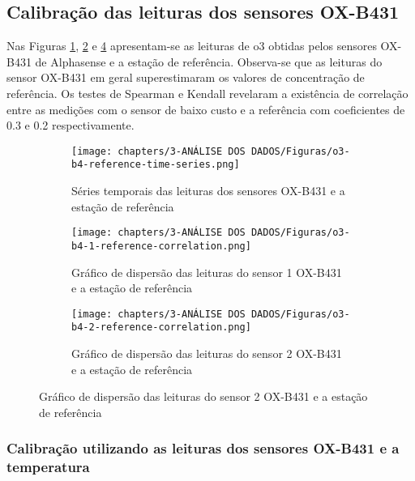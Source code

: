 
\subsection{Calibração das leituras dos sensores OX-B431}

Nas Figuras \ref{fig:data-o3-reference-time-series}, \ref{fig:data-o3-1-reference-corr} e \ref{fig:data-o3-2-reference-corr} apresentam-se as leituras de \acrshort{o3} obtidas pelos sensores OX-B431 de Alphasense e a estação de referência. Observa-se que as leituras do sensor OX-B431 em geral superestimaram os valores de concentração de referência. Os testes de Spearman e Kendall revelaram a existência de correlação entre as medições com o sensor de baixo custo e a referência com coeficientes de 0.3 e 0.2 respectivamente.

\begin{figure}[h]
    \centering
    \caption{Séries temporais e gráficos de dispersão das medições de \acrshort{o3}}
    \begin{subfigure}{0.99\textwidth}
        \texttt{[image: chapters/3-ANÁLISE DOS DADOS/Figuras/o3-b4-reference-time-series.png]}
        \caption{Séries temporais das leituras dos sensores OX-B431 e a estação de referência}
        \label{fig:data-o3-reference-time-series}
    \end{subfigure}
    \hfill
    \begin{subfigure}{0.495\textwidth}
        \texttt{[image: chapters/3-ANÁLISE DOS DADOS/Figuras/o3-b4-1-reference-correlation.png]}
        \caption{Gráfico de dispersão das leituras do sensor 1 OX-B431 e a estação de referência}
        \label{fig:data-o3-1-reference-corr}
    \end{subfigure}
    \hfill
    \begin{subfigure}{0.495\textwidth}
        \texttt{[image: chapters/3-ANÁLISE DOS DADOS/Figuras/o3-b4-2-reference-correlation.png]}
        \caption{Gráfico de dispersão das leituras do sensor 2 OX-B431 e a estação de referência}
        \label{fig:data-o3-2-reference-corr}
    \end{subfigure}
\end{figure}

\subsubsection{Calibração utilizando as leituras dos sensores OX-B431 e a temperatura}

